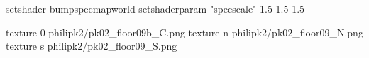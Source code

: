 setshader bumpspecmapworld
setshaderparam "specscale" 1.5 1.5 1.5

texture 0 philipk2/pk02_floor09b_C.png
texture n philipk2/pk02_floor09_N.png
texture s philipk2/pk02_floor09_S.png

